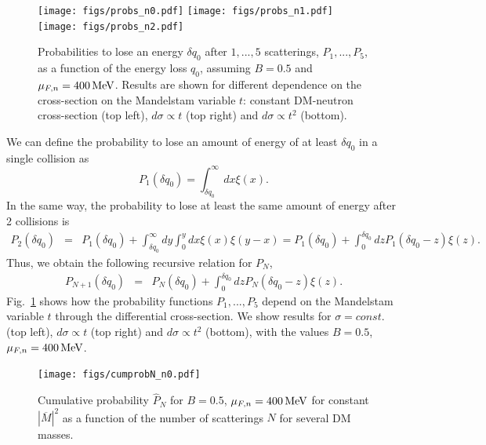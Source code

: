 \begin{figure}[t]
    \centering
    \texttt{[image: figs/probs\_n0.pdf]}
    \texttt{[image: figs/probs\_n1.pdf]}\\
    \texttt{[image: figs/probs\_n2.pdf]}
    \caption{Probabilities to lose an energy $\delta q_0$  after $1,...,5$ scatterings,  $P_1,...,P_5$, as a function of the energy loss $q_0$,  assuming $B=0.5$ and $\mu_{F,n}=400{\rm \,MeV}$. Results are shown for different dependence on the cross-section on the Mandelstam variable $t$: constant DM-neutron cross-section (top left), $d\sigma\propto t$ (top right) and $d\sigma\propto t^2$ (bottom). }
    \label{fig:pn}
\end{figure}


We can define the probability to lose an amount of energy of at least $\delta q_0$ in a single collision as
\begin{equation}
    P_1(\delta q_0) = \int_{\delta q_0}^\infty dx \xi(x).
\end{equation}
In the same way, the probability to lose at least the same amount of energy after 2 collisions is
\begin{eqnarray}
 P_2(\delta q_0) &=& P_1(\delta q_0) + \int_{\delta q_0}^\infty dy \int_0^y dx \xi(x)\xi(y-x) = P_1(\delta q_0) + \int_0^{\delta q_0} dz P_1(\delta q_0-z)\xi(z).
\end{eqnarray}
Thus, we obtain the following recursive relation for  $P_N$, 
\begin{eqnarray}
 P_{N+1}(\delta q_0) &=& P_N(\delta q_0) + \int_0^{\delta q_0} dz P_N(\delta q_0-z)\xi(z).\label{eq:pnrecurrent}
\end{eqnarray} 
Fig.~\ref{fig:pn} shows how the probability functions $P_1,...,P_5$ depend on the Mandelstam variable $t$ through the differential cross-section. We show results for $\sigma=const.$ (top left), $d\sigma\propto t$ (top right) and $d\sigma\propto t^2$ (bottom), with the values $B=0.5$, $\mu_{F,n}=400{\rm \,MeV}$.

\begin{figure}
    \centering
    \texttt{[image: figs/cumprobN\_n0.pdf]}
    \caption{Cumulative probability $\hat{P}_N$ for $B=0.5$,  $\mu_{F,n}=400{\rm \,MeV}$ for constant $|\overline{M}|^2$ as a function of the number of scatterings $N$ for several DM masses. }
    \label{fig:pnofn}
\end{figure}


